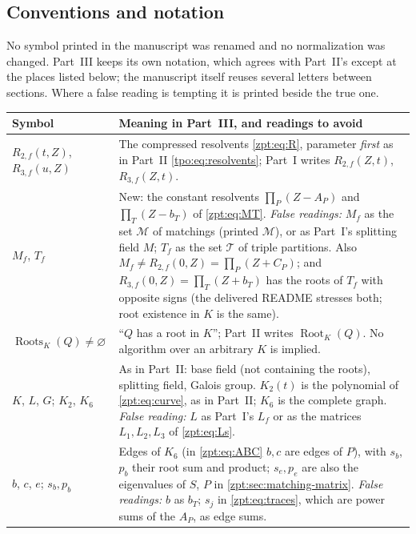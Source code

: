 \documentclass[11pt,letterpaper]{article}
\numberwithin{equation}{section}
\theoremstyle{definition}
\theoremstyle{remark}
\newcommand{\Rtwo}{R_{2,f}}
\newcommand{\Rthree}{R_{3,f}}
\newcommand{\tpoM}{\mathcal M}
\newcommand{\tpoT}{\mathcal T}
\DeclareMathOperator{\Roots}{Roots}
\begin{document}
\subsection{Conventions and notation}
\label{zpt:sec:notation}

No symbol printed in the manuscript was renamed and no normalization was
changed. Part~III keeps its own notation, which agrees with Part~II's
except at the places listed below; the manuscript itself reuses several
letters between sections. Where a false reading is tempting it is printed
beside the true one.

\begin{center}
\small
\begin{longtable}{@{}>{\raggedright\arraybackslash}p{}
 >{\raggedright\arraybackslash}p{}@{}}
\toprule
Symbol & Meaning in Part~III, and readings to avoid\\
\midrule
\endhead
\bottomrule
\endfoot
$\Rtwo(t,Z)$, $\Rthree(u,Z)$ & The compressed resolvents
\eqref{zpt:eq:R}, parameter \emph{first} as in Part~II
\eqref{tpo:eq:resolvents}; Part~I writes $\Rtwo(Z,t)$, $\Rthree(Z,t)$.\\[3pt]
$M_f$, $T_f$ & New: the constant resolvents
$\prod_P(Z-A_P)$ and $\prod_T(Z-b_T)$ of \eqref{zpt:eq:MT}.
\emph{False readings:} $M_f$ as the set $\tpoM$ of matchings (printed
$\mathcal M$), or as Part~I's splitting field $M$; $T_f$ as the set $\tpoT$
of triple partitions. Also $M_f\ne\Rtwo(0,Z)=\prod_P(Z+C_P)$; and
$\Rthree(0,Z)=\prod_T(Z+b_T)$ has the roots of $T_f$ with opposite signs
(the delivered README stresses both; root existence in $K$ is the same).\\[3pt]
$\Roots_K(Q)\ne\varnothing$ & ``$Q$ has a root in $K$''; Part~II writes
$\operatorname{Root}_K(Q)$. No algorithm over an arbitrary $K$ is
implied.\\[3pt]
$K$, $L$, $G$; $K_2$, $K_6$ & As in Part~II: base field (not containing
the roots), splitting field, Galois group. $K_2(t)$ is the polynomial of
\eqref{zpt:eq:curve}, as in Part~II; $K_6$ is the complete graph.
\emph{False reading:} $L$ as Part~I's $L_f$ or as the matrices $L_1,L_2,L_3$
of \eqref{zpt:eq:Ls}.\\[3pt]
$b$, $c$, $e$; $s_b,p_b$ & Edges of $K_6$ (in \eqref{zpt:eq:ABC} $b,c$ are
edges of $P$), with $s_b$, $p_b$ their root sum and product; $s_e,p_e$ are
also the eigenvalues of $S$, $P$ in \cref{zpt:sec:matching-matrix}.
\emph{False readings:} $b$ as $b_T$; $s_j$ in \eqref{zpt:eq:traces}, which
are power sums of the $A_P$, as edge sums.\\[3pt]

\end{longtable}
\end{center}
\end{document}
